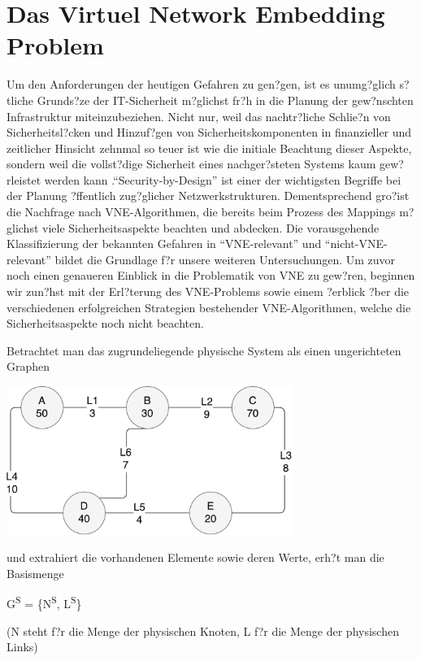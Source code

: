 \documentclass{lni}
\begin{document}
\section{Das Virtuel Network Embedding Problem}
\label{sec:VNE-Problem}
Um den Anforderungen der heutigen Gefahren zu gen?gen, ist es unumg?glich s?tliche Grunds?ze der IT-Sicherheit m?glichst fr?h in die Planung der gew?nschten Infrastruktur miteinzubeziehen. Nicht nur, weil das nachtr?liche Schlie?n von Sicherheitsl?cken und Hinzuf?gen von Sicherheitskomponenten in finanzieller und zeitlicher Hinsicht zehnmal so teuer ist wie die initiale Beachtung dieser Aspekte, sondern weil die vollst?dige Sicherheit eines nachger?steten Systems kaum gew?rleistet werden kann \cite{Cole}."`Security-by-Design"' ist einer der wichtigsten Begriffe bei der Planung ?ffentlich zug?glicher Netzwerkstrukturen. Dementsprechend gro?ist die Nachfrage nach VNE-Algorithmen, die bereits beim Prozess des Mappings m?glichst viele Sicherheitsaspekte beachten und abdecken. Die vorausgehende Klassifizierung der bekannten Gefahren in "`VNE-relevant"' und "`nicht-VNE-relevant"' bildet die Grundlage f?r unsere weiteren Untersuchungen. Um zuvor noch einen genaueren Einblick in die Problematik von VNE zu gew?ren, beginnen wir zun?hst mit der Erl?terung des VNE-Problems sowie einem ?erblick ?ber die verschiedenen erfolgreichen Strategien bestehender VNE-Algorithmen, welche die Sicherheitsaspekte noch nicht beachten. 

Betrachtet man das zugrundeliegende physische System als einen ungerichteten Graphen
\begin{center}
	\includegraphics[width=0.7\textwidth]{physical_structure2.pdf}\newline
\end{center}
\vspace*{1cm}

und extrahiert die vorhandenen Elemente sowie deren Werte, erh?t man die Basismenge
\begin{center}
G\textsuperscript{S} = \{N\textsuperscript{S}, L\textsuperscript{S}\}\newline

(N steht f?r die Menge der physischen Knoten, L f?r die Menge der physischen Links)
\end{center}
\end{document}
